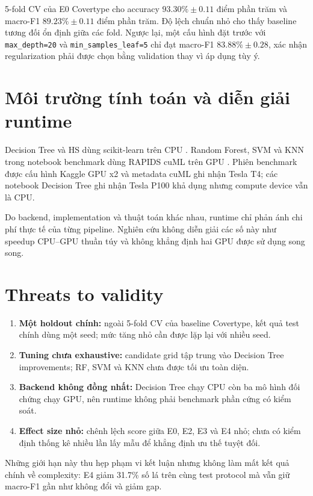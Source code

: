 5-fold CV của E0 Covertype cho accuracy $93.30\%\pm0.11$ điểm phần trăm và macro-F1 $89.23\%\pm0.11$ điểm phần trăm. Độ lệch chuẩn nhỏ cho thấy baseline tương đối ổn định giữa các fold. Ngược lại, một cấu hình đặt trước với \texttt{max\_depth=20} và \texttt{min\_samples\_leaf=5} chỉ đạt macro-F1 $83.88\%\pm0.28$, xác nhận regularization phải được chọn bằng validation thay vì áp dụng tùy ý.

\section{Môi trường tính toán và diễn giải runtime}

Decision Tree và HS dùng scikit-learn trên CPU \cite{pedregosa2011sklearn}. Random Forest, SVM và KNN trong notebook benchmark dùng RAPIDS cuML trên GPU \cite{rapidsCuml}. Phiên benchmark được cấu hình Kaggle GPU x2 và metadata cuML ghi nhận Tesla T4; các notebook Decision Tree ghi nhận Tesla P100 khả dụng nhưng compute device vẫn là CPU.

Do backend, implementation và thuật toán khác nhau, runtime chỉ phản ánh chi phí thực tế của từng pipeline. Nghiên cứu không diễn giải các số này như speedup CPU--GPU thuần túy và không khẳng định hai GPU được sử dụng song song.

\section{Threats to validity}

\begin{enumerate}
    \item \textbf{Một holdout chính:} ngoài 5-fold CV của baseline Covertype, kết quả test chính dùng một seed; mức tăng nhỏ cần được lặp lại với nhiều seed.
    \item \textbf{Tuning chưa exhaustive:} candidate grid tập trung vào Decision Tree improvements; RF, SVM và KNN chưa được tối ưu toàn diện.
    \item \textbf{Backend không đồng nhất:} Decision Tree chạy CPU còn ba mô hình đối chứng chạy GPU, nên runtime không phải benchmark phần cứng có kiểm soát.
    \item \textbf{Effect size nhỏ:} chênh lệch score giữa E0, E2, E3 và E4 nhỏ; chưa có kiểm định thống kê nhiều lần lấy mẫu để khẳng định ưu thế tuyệt đối.
\end{enumerate}

Những giới hạn này thu hẹp phạm vi kết luận nhưng không làm mất kết quả chính về complexity: E4 giảm 31.7\% số lá trên cùng test protocol mà vẫn giữ macro-F1 gần như không đổi và giảm gap.
